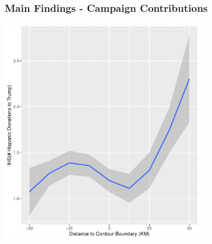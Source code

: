\documentclass{beamer}
\begin{document}
\begin{frame}
\frametitle{Main Findings - Campaign Contributions}
\centering
        \includegraphics[width=0.65\textwidth]{../../analysis/Output/graphs/hispanictrump.pdf}\\
\end{frame}
\end{document}
